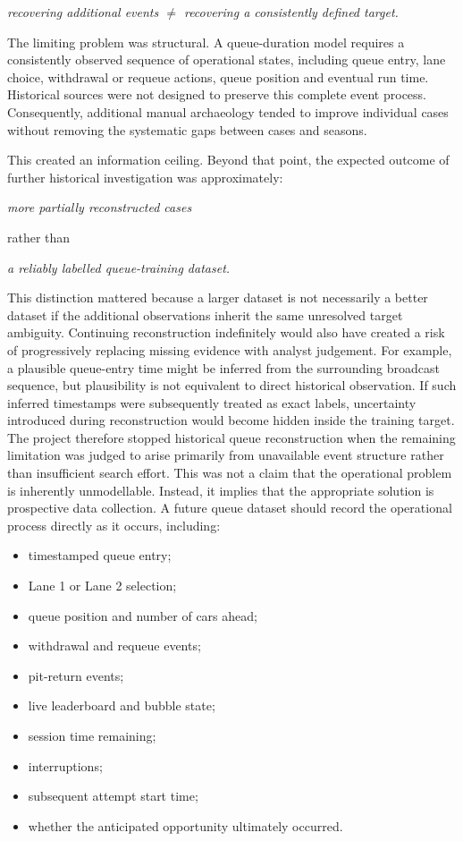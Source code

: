 \begin{center}\textit{recovering additional events \ensuremath{\neq} recovering a consistently defined target.}\end{center}

The limiting problem was structural. A queue-duration model requires a consistently observed sequence of operational states, including queue entry, lane choice, withdrawal or requeue actions, queue position and eventual run time. Historical sources were not designed to preserve this complete event process. Consequently, additional manual archaeology tended to improve individual cases without removing the systematic gaps between cases and seasons.

This created an information ceiling. Beyond that point, the expected outcome of further historical investigation was approximately:

\begin{center}\textit{more partially reconstructed cases}\end{center}

rather than

\begin{center}\textit{a reliably labelled queue-training dataset.}\end{center}

This distinction mattered because a larger dataset is not necessarily a better dataset if the additional observations inherit the same unresolved target ambiguity. Continuing reconstruction indefinitely would also have created a risk of progressively replacing missing evidence with analyst judgement. For example, a plausible queue-entry time might be inferred from the surrounding broadcast sequence, but plausibility is not equivalent to direct historical observation. If such inferred timestamps were subsequently treated as exact labels, uncertainty introduced during reconstruction would become hidden inside the training target. The project therefore stopped historical queue reconstruction when the remaining limitation was judged to arise primarily from unavailable event structure rather than insufficient search effort. This was not a claim that the operational problem is inherently unmodellable. Instead, it implies that the appropriate solution is prospective data collection. A future queue dataset should record the operational process directly as it occurs, including:

\begin{itemize}
\item timestamped queue entry;
\item Lane 1 or Lane 2 selection;
\item queue position and number of cars ahead;
\item withdrawal and requeue events;
\item pit-return events;
\item live leaderboard and bubble state;
\item session time remaining;
\item interruptions;
\item subsequent attempt start time;
\item whether the anticipated opportunity ultimately occurred.
\end{itemize}

